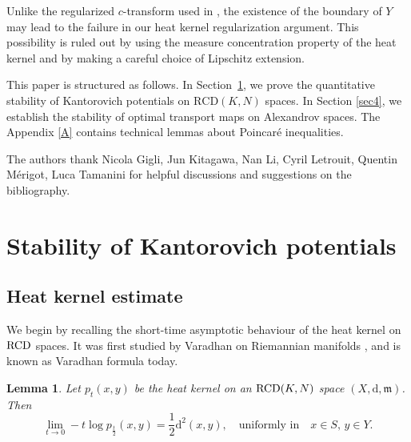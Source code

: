 \documentclass[a4paper,11pt]{article}
\numberwithin{equation}{section}
\theoremstyle{plain}
\newtheorem{lemma}[theorem]{Lemma}
\theoremstyle{definition}
\theoremstyle{remark}
\newcommand{\mm}{\mathfrak m}
\newcommand{\ms}{(X,\d,\mm)}
\renewcommand{\d}{{\mathrm d}}
\begin{document}
Unlike the regularized $c$-transform used in \cite{arXiv:2504.05412},  the existence of the boundary of $Y$ may lead to the failure in our heat kernel regularization argument.  This possibility is ruled out by using the measure concentration property of the heat kernel and by making a careful choice of Lipschitz extension.







	






\medskip

	  This paper is structured as follows. In Section~\ref{sec3}, we prove the quantitative stability of Kantorovich potentials on $\mathrm{RCD}(K,N)$ spaces. In Section \ref{sec4}, we establish the stability of optimal transport maps on Alexandrov spaces. The Appendix \ref{A} contains technical lemmas about Poincar\'e inequalities.

	\medskip

 The authors  thank Nicola Gigli, Jun Kitagawa, Nan Li,  Cyril Letrouit, Quentin M\'erigot, Luca Tamanini for  helpful discussions and  suggestions on the bibliography.


	\section{Stability of Kantorovich potentials}\label{sec3}

	
	
	\subsection{Heat kernel estimate}
	We begin by recalling the short-time asymptotic behaviour of the heat kernel on ${\rm RCD}$ spaces. It was first studied by Varadhan on Riemannian manifolds \cite{zbMATH03249197}, and is known as Varadhan formula today. 
	\begin{lemma}\label{lemma0.2}
		Let $p_t(x,y)$ be the heat kernel on an ${\rm RCD}(K,N)$ space $\ms$.  Then
		\begin{equation}
			\lim_{t\rightarrow 0}-t \log p_\frac{t}{2}(x,y)=\frac{1}{2}\d^2(x,y),\quad \text{uniformly in}  \quad x\in S,\, y\in Y.
		\end{equation}
	\end{lemma}
	
\end{document}
